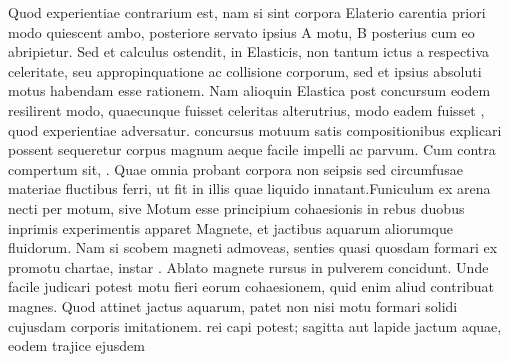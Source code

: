 Quod experientiae\protect{} contrarium est, nam si sint corpora Elaterio\protect{} carentia priori modo quiescent ambo, posteriore servato ipsius A motu, B posterius cum eo abripietur. Sed et calculus ostendit,  in Elasticis, non tantum ictus a respectiva celeritate, seu appropinquatione ac collisione corporum, sed et ipsius absoluti motus habendam esse rationem. Nam alioquin Elastica\protect{} post concursum eodem resilirent modo, quaecunque fuisset celeritas alterutrius, modo eadem fuisset , quod experientiae adversatur.  concursus motuum satis compositionibus explicari possent sequeretur corpus magnum aeque facile impelli ac parvum. Cum contra compertum sit, . Quae omnia probant corpora non seipsis sed circumfusae materiae fluctibus ferri, ut fit in illis quae liquido innatant.\pend\pstart Funiculum ex arena necti per motum, sive Motum esse principium cohaesionis\protect{} in rebus duobus inprimis experimentis apparet Magnete\protect{}, et jactibus aquarum aliorumque fluidorum. Nam si  scobem  magneti admoveas, senties  quasi quosdam formari ex promotu chartae, instar . Ablato magnete rursus in pulverem concidunt. Unde facile judicari potest motu fieri eorum cohaesionem, quid enim aliud contribuat magnes. Quod attinet jactus aquarum, patet non nisi motu formari  solidi cujusdam corporis imitationem.   rei capi potest;   sagitta aut lapide jactum aquae, eodem trajice ejusdem 